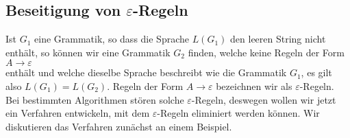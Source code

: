 \subsection{Beseitigung von $\varepsilon$-Regeln}
Ist $G_1$ eine Grammatik, so dass die Sprache $L(G_1)$ den leeren String nicht enth\"alt, so
k\"onnen wir eine Grammatik $G_2$ finden, welche keine Regeln der Form
\\[0.2cm]
\hspace*{1.3cm}
$A \rightarrow \varepsilon$
\\[0.2cm]
enth\"alt und welche dieselbe Sprache beschreibt wie die Grammatik $G_1$, es gilt also $L(G_1) = L(G_2)$. 
Regeln  der Form $A \rightarrow \varepsilon$ bezeichnen wir als $\varepsilon$-Regeln.  Bei
bestimmten Algorithmen st\"oren solche $\varepsilon$-Regeln, deswegen wollen wir jetzt ein Verfahren
entwickeln, mit dem $\varepsilon$-Regeln eliminiert werden k\"onnen.  
Wir diskutieren das Verfahren zun\"achst an einem Beispiel.

